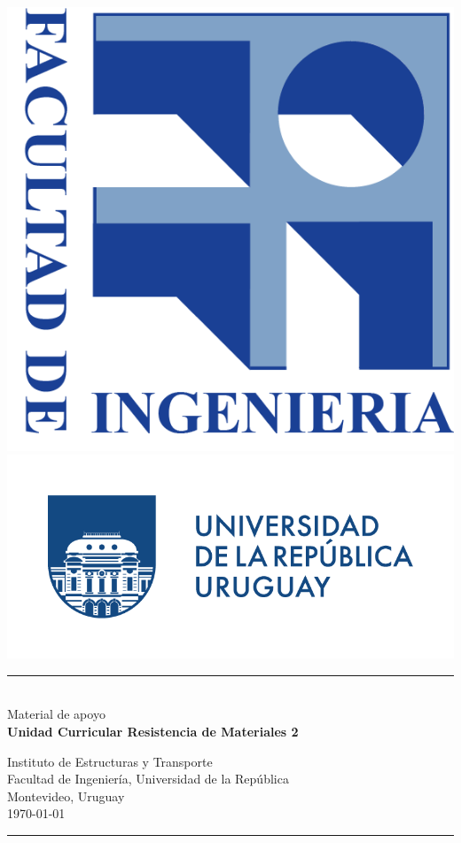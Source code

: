 \documentclass{textbook}
\numberwithin{equation}{chapter}
\begin{document}
\frontmatter
\begin{titlepage}
	\doublespacing
	\begin{center}
		\includegraphics[height=0.14\textwidth]{figs/logofing}
		\hfill
		\includegraphics[height=0.17\textwidth]{figs/logoudelar}    
        \rule{\linewidth}{0.5mm} \\[4mm]
		{\large\sffamily Material de apoyo} \\
		{\large\sffamily\bfseries	Unidad Curricular Resistencia de Materiales 2}\\[0.1cm]
		
	\singlespacing
		
		{\sffamily \small
	Instituto de Estructuras y Transporte\\
	Facultad de Ingeniería, Universidad de la República\\
	Montevideo, Uruguay\\[0.1cm]
	
	\today
}

		\rule{\linewidth}{0.5mm} \\[2mm]
	\end{center}
  
\end{titlepage}
\thispagestyle{empty}
~

\newpage
\thispagestyle{empty}



\newpage
\tableofcontents
\thispagestyle{empty}

\mainmatter


%
%
%
%
%
%
%
%
%




%
%
\end{document}
